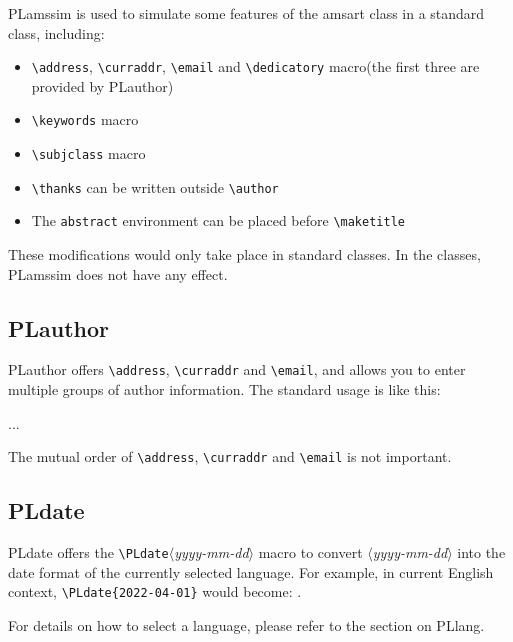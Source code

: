 \documentclass[allowbf]{lebhart}
\providecommand{\meta}[1]{$\langle${\normalfont\itshape#1}$\rangle$}
\providecommand{\PLamssim}{\textsf{PLamssim}}
\providecommand{\PLauthor}{\textsf{PLauthor}}
\providecommand{\PLdatestr}{\textsf{PLdate}}
\providecommand{\PLlang}{\textsf{PLlang}}
\begin{document}
\PLamssim{} is used to simulate some features of the \textsf{amsart} class in a standard class, including:
\begin{itemize}
    \item \lstinline|\address|, \lstinline|\curraddr|, \lstinline|\email| and \lstinline|\dedicatory| macro(the first three are provided by \PLauthor{})
    \item \lstinline|\keywords| macro
    \item \lstinline|\subjclass| macro
    \item \lstinline|\thanks| can be written outside \lstinline|\author|
    \item The \lstinline|abstract| environment can be placed before \lstinline|\maketitle|
\end{itemize}

These modifications would only take place in standard classes. In the \AmS{} classes, \PLamssim{} does not have any effect.

\subsection{PLauthor}

\PLauthor{} offers \lstinline|\address|, \lstinline|\curraddr| and \lstinline|\email|, and allows you to enter multiple groups of author information. The standard usage is like this:
\begin{code}
  \author{(*\meta{author 1}*)}
  \address{(*\meta{address 1}*)}
  \email{(*\meta{email 1}*)}
  \author{(*\meta{author 2}*)}
  \address{(*\meta{address 2}*)}
  \email{(*\meta{email 2}*)}
  ...
\end{code}
The mutual order of \lstinline|\address|, \lstinline|\curraddr| and \lstinline|\email| is not important.

\subsection{PLdate}

\PLdatestr{} offers the \lstinline|\PLdate|\meta{yyyy-mm-dd} macro to convert \meta{yyyy-mm-dd} into the date format of the currently selected language. For example, in current English context, \lstinline|\PLdate{2022-04-01}| would become: .

For details on how to select a language, please refer to the section on \PLlang{}.
\end{document}
